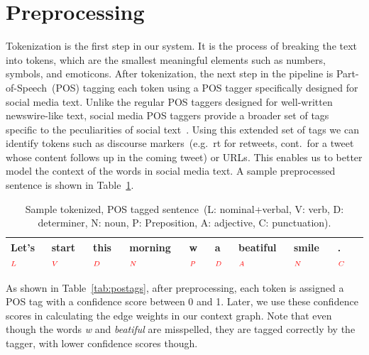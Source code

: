 \documentclass[a4paper,onesided,12pt]{report}
\begin{document}
\section{Preprocessing}


Tokenization is the first step in our system. It is the process of breaking the text into tokens, which are the smallest meaningful elements such as numbers, symbols, and emoticons. After tokenization, the next step in the pipeline is Part-of-Speech~(POS) tagging each token using a POS tagger specifically designed for social media text. Unlike the regular POS taggers designed for well-written newswire-like text, social media POS taggers provide a broader set of tags specific to the peculiarities of social text~\cite{owoputi2013improved,Gimpel:2011:PTT:2002736.2002747}. Using this extended set of tags we can identify tokens such as discourse markers~(e.g.~rt for retweets, cont.~for a tweet whose content follows up in the coming tweet) or URLs. This enables us to better model the context of the words in social media text. A sample preprocessed sentence is shown in Table~\ref{tab:postagged}.

\begin{table}[tbhp]
\caption{Sample tokenized, POS tagged sentence~(L: nominal+verbal, V: verb, D: determiner, N: noun, P: Preposition, A: adjective, C: punctuation).}
\centering
\begin{tabular}{|l|l|l|l|l|l|l|l|l|l|}
\hline
Let's$_{\textcolor{red}{L}}$ & start$_{\textcolor{red}V}$ & this$_{\textcolor{red}D}$ & morning$_{\textcolor{red}N}$ & w$_{\textcolor{red}P}$ & a$_{\textcolor{red}D}$ & beatiful$_{\textcolor{red}A}$ & smile$_{\textcolor{red}N}$ & .$_{\textcolor{red}C}$\\
\hline
\end{tabular}
\label{tab:postagged}
\end{table}
\newpage
As shown in Table~\ref{tab:postags}, after preprocessing, each token is assigned a POS tag with a confidence score between 0 and 1. Later, we use these confidence scores in calculating the edge weights in our context graph. Note that even though the words \emph{w} and\emph{ beatiful} are misspelled, they are tagged correctly by the tagger, with lower confidence scores though.
\end{document}
